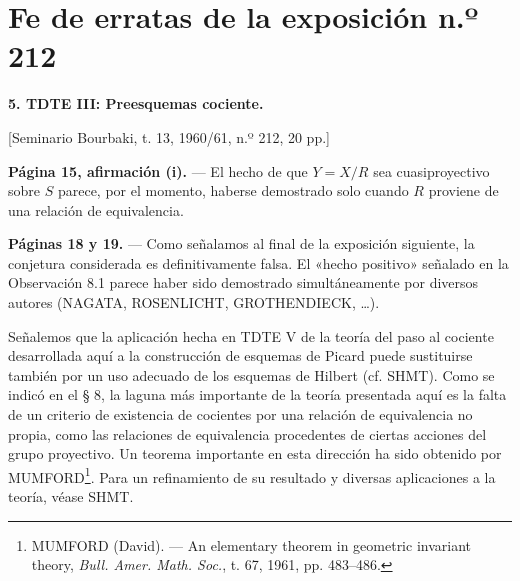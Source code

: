 \clearpage
\chapter*{Fe de erratas de la exposición n.º 212}
\setcounter{footnote}{2}

\noindent\textbf{5. TDTE III: Preesquemas cociente.}

\begin{center}
[Seminario Bourbaki, t. 13, 1960/61, n.º 212, 20 pp.]
\end{center}

\noindent\textbf{Página 15, afirmación (i).} --- El hecho de que $Y=X/R$ sea
cuasiproyectivo sobre $S$ parece, por el momento, haberse demostrado solo
cuando $R$ proviene de una relación de equivalencia.

\noindent\textbf{Páginas 18 y 19.} --- Como señalamos al final de la exposición
siguiente, la conjetura considerada es definitivamente falsa. El «hecho
positivo» señalado en la Observación 8.1 parece haber sido demostrado
simultáneamente por diversos autores (NAGATA, ROSENLICHT, GROTHENDIECK,
\ldots).

Señalemos que la aplicación hecha en TDTE V de la teoría del paso al cociente
desarrollada aquí a la construcción de esquemas de Picard puede sustituirse
también por un uso adecuado de los esquemas de Hilbert (cf. SHMT). Como se
indicó en el § 8, la laguna más importante de la teoría presentada
aquí es la falta de un criterio de existencia de cocientes por una relación de
equivalencia no propia, como las relaciones de equivalencia procedentes de
ciertas acciones del grupo proyectivo. Un teorema importante en esta dirección
ha sido obtenido por MUMFORD\footnote{MUMFORD (David). --- An elementary
theorem in geometric invariant theory, \emph{Bull. Amer. Math. Soc.}, t. 67,
1961, pp. 483--486.}. Para un refinamiento de su resultado y diversas
aplicaciones a la teoría, véase SHMT.

